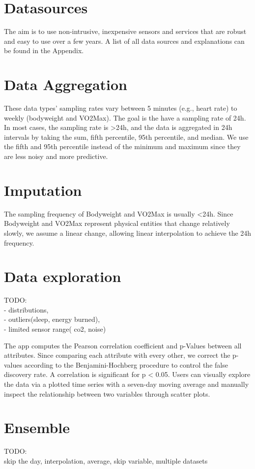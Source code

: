 \documentclass[conference]{IEEEtran}
\begin{document}
\section{Datasources}
The aim is to use non-intrusive, inexpensive sensors and services that are robust and easy to use over a few years. A list of all data sources and explanations can be found in the Appendix.


\section{Data Aggregation}
These data types' sampling rates vary between 5 minutes (e.g., heart rate) to ~ weekly (bodyweight and VO2Max).
The goal is the have a sampling rate of 24h.
In most cases, the sampling rate is >24h, and the data is aggregated in 24h intervals by taking the sum, fifth percentile, 95th percentile, and median.
We use the fifth and 95th percentile instead of the minimum and maximum since they are less noisy and more predictive.

\section{Imputation}
The sampling frequency of Bodyweight and VO2Max is usually <24h.
Since Bodyweight and VO2Max represent physical entities that change relatively slowly, we assume a linear change, allowing linear interpolation to achieve the 24h frequency.

\section{Data exploration}
\color{red}
TODO:\\
- distributions, \\
- outliers(sleep, energy burned), \\
- limited sensor range( co2, noise)\\
\color{black}

The app computes the Pearson correlation coefficient and p-Values between all attributes. Since comparing each attribute with every other, we correct the p-values according to the Benjamini-Hochberg procedure to control the false discovery rate.
A correlation is significant for p < 0.05.
Users can visually explore the data via a plotted time series with a seven-day moving average and manually inspect the relationship between two variables through scatter plots.

\section{Ensemble} 
\color{red}
TODO:\\
skip the day, interpolation, average, skip variable, multiple datasets
\color{black}
\end{document}
